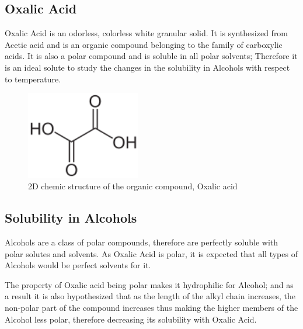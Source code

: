 

        
\subsection{{Oxalic Acid}}
        
	{Oxalic Acid is an odorless, colorless white granular solid. It is synthesized from Acetic acid and is an organic compound belonging to the family of carboxylic acids. It is also a polar compound and is soluble in all polar solvents; Therefore it is an ideal solute to study the changes in the solubility in Alcohols with respect to temperature.}
		
\begin{figure}[H]
\centering
\includegraphics[width=5cm]{Oxacid.svg.png}
    		\caption{{2D chemic structure of the organic compound, Oxalic acid}}
\end{figure} 
            
\subsection{{Solubility in Alcohols}}
			
	{Alcohols are a class of polar compounds, therefore are perfectly soluble with polar solutes and solvents. As Oxalic Acid is polar, it is expected that all types of Alcohols would be perfect solvents for it.}
			
	{The property of Oxalic acid being polar makes it hydrophilic for Alcohol; and as a result it is also hypothesized that as the length of the alkyl chain increases, the non-polar part of the compound increases thus making the higher members of the Alcohol less polar, therefore decreasing its solubility with Oxalic Acid.}
			
            


            

            
        

        
        


